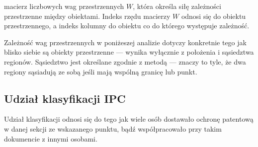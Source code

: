 { macierz liczbowych wag przestrzennych $W$,
  która określa siłę zależności przestrzenne między obiektami.
  Indeks rzędu macierzy $W$ odnosi się do obiektu przestrzennego,
  a indeks kolumny do obiektu co do którego występuje zależność.}

Zależność wag przestrzennych w poniżeszej analizie dotyczy 
konkretnie tego jak blisko siebie są obiekty przestrzenne ---
wynika wyłącznie z położenia i sąsiedztwa regionów.
Sąsiedztwo jest określane zgodnie z metodą 
--- znaczy to tyle, że dwa regiony sąsiadują ze sobą
jeśli mają wspólną granicę lub punkt.




  \subsection
{Udział klasyfikacji \ac{IPC}}\label{udział-klasyfikacji}

Udział klasyfikacji odnosi się do tego jak wiele osób dostawało 
ochronę patentową w danej sekcji ze wskazanego punktu, 
bądź współpracowało przy takim dokumencie z innymi osobami.

